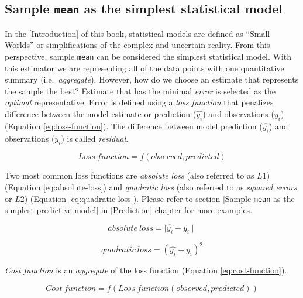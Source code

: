 \documentclass[
]{book}
\begin{document}
\hypertarget{sample-mean-as-the-simplest-statistical-model}{%
\subsection{\texorpdfstring{Sample \texttt{mean} as the simplest statistical model}{Sample mean as the simplest statistical model}}\label{sample-mean-as-the-simplest-statistical-model}}

In the {[}Introduction{]} of this book, statistical models are defined as ``Small Worlds'' or simplifications of the complex and uncertain reality. From this perspective, sample \texttt{mean} can be considered the simplest statistical model. With this estimator we are representing all of the data points with one quantitative summary (i.e.~\emph{aggregate}). However, how do we choose an estimate that represents the sample the best? Estimate that has the minimal \emph{error} is selected as the \emph{optimal} representative. Error is defined using a \emph{loss function} that penalizes difference between the model estimate or prediction (\(\hat{y_i}\)) and observations (\(y_i\)) (Equation \eqref{eq:loss-function}). The difference between model prediction (\(\hat{y_i}\)) and observations (\(y_i\)) is called \emph{residual}.

\begin{equation}
  Loss \: function = f(observed, predicted)
  \label{eq:loss-function}
\end{equation}

Two most common loss functions are \emph{absolute loss} (also referred to as \(L1\)) (Equation \eqref{eq:absolute-loss}) and \emph{quadratic loss} (also referred to as \emph{squared errors} or \(L2\)) (Equation \eqref{eq:quadratic-loss}). Please refer to section {[}Sample \texttt{mean} as the simplest predictive model{]} in {[}Prediction{]} chapter for more examples.

\begin{equation}
  absolute \: loss = \mid{\hat{y_i} - y_i\mid}
  \label{eq:absolute-loss}
\end{equation}

\begin{equation}
  quadratic \: loss = (\hat{y_i} - y_i)^2
  \label{eq:quadratic-loss}
\end{equation}

\emph{Cost function} is an \emph{aggregate} of the loss function (Equation \eqref{eq:cost-function}).

\begin{equation}
  Cost \: function = f(Loss \: function (observed, predicted))
  \label{eq:cost-function}
\end{equation}
\end{document}
